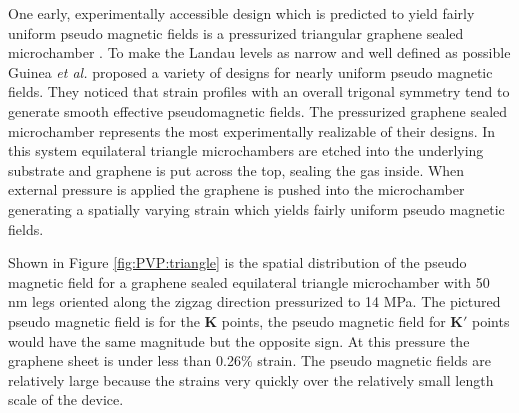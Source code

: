 One early, experimentally accessible design which is predicted to yield fairly uniform pseudo magnetic fields is a pressurized triangular graphene sealed microchamber \cite{Guinea2009}.
To make the Landau levels as narrow and well defined as possible Guinea \textit{et al.} proposed a variety of designs for nearly uniform pseudo magnetic fields.
They noticed that strain profiles with an overall trigonal symmetry tend to generate smooth effective pseudomagnetic fields.
The pressurized graphene sealed microchamber represents the most experimentally realizable of their designs.
In this system equilateral triangle microchambers are etched into the underlying substrate and graphene is put across the top, sealing the gas inside.
When external pressure is applied the graphene is pushed into the microchamber generating a spatially varying strain which yields fairly uniform pseudo magnetic fields.

Shown in Figure \ref{fig:PVP:triangle} is the spatial distribution of the pseudo magnetic field for a graphene sealed equilateral triangle microchamber with 50 nm legs oriented along the zigzag direction pressurized to 14 MPa.
The pictured pseudo magnetic field is for the $\bm{K}$ points, the pseudo magnetic field for $\bm{K'}$ points would have the same magnitude but the opposite sign.
At this pressure the graphene sheet is under less than 0.26\% strain.
The pseudo magnetic fields are relatively large because the strains very quickly over the relatively small length scale of the device.

